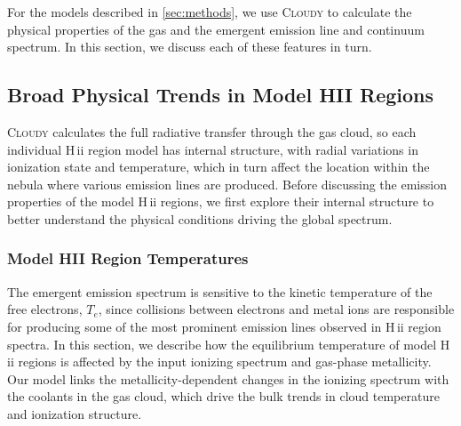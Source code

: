 \documentclass[trackchanges, twocolumn, tighten]{aastex61}
\newcommand{\Sec}[1]{\autoref{sec:#1}}
\newcommand{\Cloudy}{\textsc{Cloudy}\xspace}
\newcommand{\Te}{\ensuremath{T_{e}}}
\newcommand{\hii}{H\,{\sc ii}\xspace}
\begin{document}
For the models described in \Sec{methods}, we use \Cloudy to calculate the physical properties of the gas and the emergent emission line and continuum spectrum. In this section, we discuss each of these features in turn.

\subsection{Broad Physical Trends in Model HII Regions}\label{sec:models:broad}

\Cloudy calculates the full radiative transfer through the gas cloud, so each individual \hii region model has internal structure, with radial variations in ionization state and temperature, which in turn affect the location within the nebula where various emission lines are produced. Before discussing the emission properties of the model \hii regions, we first explore their internal structure to better understand the physical conditions driving the global spectrum.

\subsubsection{Model HII Region Temperatures}\label{sec:models:broad:temp}

The emergent emission spectrum is sensitive to the kinetic temperature of the free electrons, \Te{}, since collisions between electrons and metal ions are responsible for producing some of the most prominent emission lines observed in \hii region spectra. In this section, we describe how the equilibrium temperature of model \hii regions is affected by the input ionizing spectrum and gas-phase metallicity. Our model links the metallicity-dependent changes in the ionizing spectrum with the coolants in the gas cloud, which drive the bulk trends in cloud temperature and ionization structure.
\end{document}
